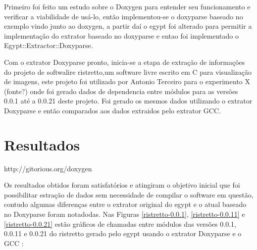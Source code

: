 Primeiro foi feito um estudo sobre o Doxygen para entender seu funcionamento e
verificar a viabilidade de usá-lo, então implementou-se o doxyparse baseado no
exemplo vindo junto ao doxygen, a partir daí o egypt foi alterado para permitir
a implementação do extrator baseado no doxyparse e entao foi implementado o
Egypt::Extractor::Doxyparse.

Com o extrator Doxyparse pronto, inicia-se a etapa de extração de informações do projeto de softwalire ristretto,um software livre escrito em C para visualização de imagens, este projeto foi utilizado por Antonio Terceiro para o experimento X (fonte?) onde foi gerado dados de dependencia entre módulos para as versões 0.0.1 até a 0.0.21 deste projeto. Foi gerado os mesmos dados utilizando o extrator Doxyparse e então comparados aos dados extraidos pelo extrator GCC.

\section{Resultados}

http://gitorious.org/doxygen

Os resultados obtidos foram satisfatórios e atingiram o objetivo inicial que foi possibilitar estração de dados sem necessidade de compilar o software em questão, contudo algumas diferenças entre o extrator original do egypt e o atual baseado no Doxyparse foram notadodas. Nas Figuras \ref{ristretto-0.0.1}, \ref{ristretto-0.0.11} e \ref{ristretto-0.0.21} estão gráficos de chamadas entre módulos das versões 0.0.1, 0.0.11 e 0.0.21 do ristretto gerado pelo egypt usando o extrator Doxyparse e o GCC :

